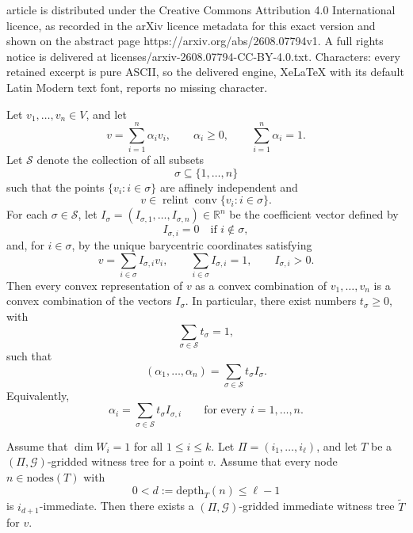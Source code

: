 \documentclass[10pt,a4paper]{amsart}
\providecommand{\cG}[0]{\ensuremath{\mathcal G}\xspace}
\let\geq\geqslant
\let\leq\leqslant
\let\geq\geqslant
\begin{document}
article is distributed under the Creative Commons Attribution 4.0 International licence, as recorded in the arXiv licence metadata for this exact version and shown on the abstract page https://arxiv.org/abs/2608.07794v1. A full rights notice is delivered at licenses/arxiv-2608.07794-CC-BY-4.0.txt. Characters: every retained excerpt is pure ASCII, so the delivered engine, XeLaTeX with its default Latin Modern text font, reports no missing character.
\begin{lemma}
\label{lem:new}
Let \(v_1,\ldots,v_n \in 
V\), and let
\[
v=\sum_{i=1}^n \alpha_i v_i,
\qquad 
\alpha_i\geq 0,
\qquad
\sum_{i=1}^n \alpha_i=1.
\]
Let \(\mathcal S\) denote the collection of all subsets
\[
\sigma \subseteq \{1,\ldots,n\}
\]
such that the points \(\{v_i : i\in \sigma\}\) are affinely independent and
\[
v \in \operatorname{relint}
\operatorname{conv}\{v_i : i\in \sigma\}.
\]
For each \(\sigma\in\mathcal S\), let \(I_\sigma=(I_{\sigma,1},\ldots,I_{\sigma,n})\in\mathbb{R}^n\) be the coefficient vector defined by
\[
I_{\sigma,i}=0 \quad\text{if } i\notin \sigma,
\]
and, for \(i\in \sigma\), by the unique barycentric coordinates satisfying
\[
v=\sum_{i\in\sigma} I_{\sigma,i}v_i,
\qquad
\sum_{i\in\sigma} I_{\sigma,i}=1,
\qquad
I_{\sigma,i}>0.
\]
Then every convex representation of \(v\) as a convex combination of
\(v_1,\ldots,v_n\) is a convex combination of the vectors \(I_\sigma\).
In particular, there exist numbers \(t_\sigma\geq 0\), with
\[
\sum_{\sigma\in\mathcal S} t_\sigma=1,
\]
such that
\[
(\alpha_1,\ldots,\alpha_n)
=
\sum_{\sigma\in\mathcal S} t_\sigma I_\sigma.
\]
Equivalently,
\[
\alpha_i
=
\sum_{\sigma\in\mathcal S} t_\sigma I_{\sigma,i}
\qquad
\text{for every } i=1,\ldots,n.
\]
\end{lemma}

\begin{lemma}
\label{lem:root-immediacy-repair}
Assume that $\dim W_i=1$ for all $1\leq i\leq k$.
Let $\Pi=(i_1,\ldots,i_\ell)$, and let $T$ be a
$(\Pi,\cG)$-gridded witness tree for a point $v$.
Assume that every node $n\in \mathrm{nodes}(T)$ with
\[
  0<d:=\mathrm{depth}_T(n)\leq \ell-1
\]
is $i_{d+1}$-immediate.  Then there exists a
$(\Pi,\cG)$-gridded immediate witness tree $\widetilde T$ for $v$.
\end{lemma}
\end{document}
